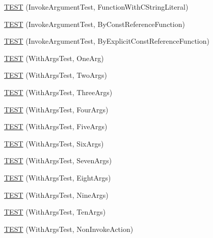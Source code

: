 \begin{DoxyCompactItemize}
\item 
\hyperlink{namespacetesting_1_1gmock__generated__actions__test_a698f1a80b7fed18141fd170524908885}{T\+E\+ST} (Invoke\+Argument\+Test, Function\+With\+C\+String\+Literal)
\item 
\hyperlink{namespacetesting_1_1gmock__generated__actions__test_a82aff636cad2f441c584fc8e3c057d56}{T\+E\+ST} (Invoke\+Argument\+Test, By\+Const\+Reference\+Function)
\item 
\hyperlink{namespacetesting_1_1gmock__generated__actions__test_accb544431629bfb38a618343daaa54c2}{T\+E\+ST} (Invoke\+Argument\+Test, By\+Explicit\+Const\+Reference\+Function)
\item 
\hyperlink{namespacetesting_1_1gmock__generated__actions__test_ae6ef9e9d09c01cd0699a3044fd8c3f1f}{T\+E\+ST} (With\+Args\+Test, One\+Arg)
\item 
\hyperlink{namespacetesting_1_1gmock__generated__actions__test_afadf90d2d0acc55906bfd7f0f43f8a04}{T\+E\+ST} (With\+Args\+Test, Two\+Args)
\item 
\hyperlink{namespacetesting_1_1gmock__generated__actions__test_acae0920fc83b3990663b9d448b8bfd9a}{T\+E\+ST} (With\+Args\+Test, Three\+Args)
\item 
\hyperlink{namespacetesting_1_1gmock__generated__actions__test_ab7046e566f75756b6fe1ec4d92ff7c2b}{T\+E\+ST} (With\+Args\+Test, Four\+Args)
\item 
\hyperlink{namespacetesting_1_1gmock__generated__actions__test_ab51a43ea1c760e001330400d6cec5bfc}{T\+E\+ST} (With\+Args\+Test, Five\+Args)
\item 
\hyperlink{namespacetesting_1_1gmock__generated__actions__test_a167731ec11d5cf4135d95b01dc59e223}{T\+E\+ST} (With\+Args\+Test, Six\+Args)
\item 
\hyperlink{namespacetesting_1_1gmock__generated__actions__test_a04970f4db4de11d91e59ae8769dccea1}{T\+E\+ST} (With\+Args\+Test, Seven\+Args)
\item 
\hyperlink{namespacetesting_1_1gmock__generated__actions__test_a5cbb36915cb29391752600a2a0e9c7e1}{T\+E\+ST} (With\+Args\+Test, Eight\+Args)
\item 
\hyperlink{namespacetesting_1_1gmock__generated__actions__test_aee9acec4535339649dd3067f671cc6c1}{T\+E\+ST} (With\+Args\+Test, Nine\+Args)
\item 
\hyperlink{namespacetesting_1_1gmock__generated__actions__test_a6a818f5a6c2250d3944f90e4331ebc0e}{T\+E\+ST} (With\+Args\+Test, Ten\+Args)
\item 
\hyperlink{namespacetesting_1_1gmock__generated__actions__test_a5380c41df40cb159d58d4c4c81aeac19}{T\+E\+ST} (With\+Args\+Test, Non\+Invoke\+Action)

\end{DoxyCompactItemize}
